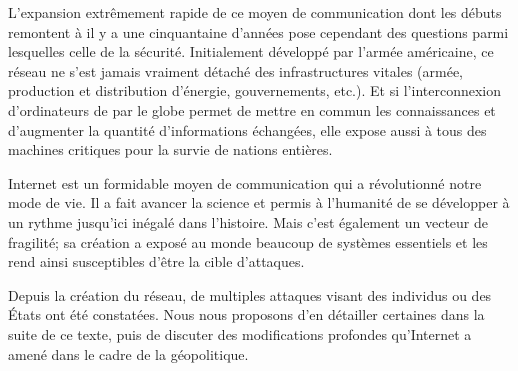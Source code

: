 \documentclass[article, french]{yReport}
\begin{document}
	L'expansion extrêmement rapide de ce moyen de communication dont les débuts remontent à il y a une cinquantaine d'années
	pose cependant des questions parmi lesquelles celle de la sécurité. Initialement développé par l'armée américaine, ce réseau ne s'est jamais vraiment détaché des infrastructures vitales (armée, production et distribution d'énergie, gouvernements, etc.). Et si l'interconnexion d'ordinateurs de par le globe permet de mettre en commun les connaissances et d'augmenter la quantité d'informations échangées, elle expose aussi à tous des machines critiques pour la survie de nations entières.
	
	Internet est un formidable moyen de communication qui a révolutionné notre mode de vie. Il a fait avancer la science et permis à l'humanité de se développer à un rythme jusqu'ici inégalé dans l'histoire. Mais c'est également un vecteur de fragilité; sa création a exposé au monde beaucoup de systèmes essentiels et les rend ainsi susceptibles d'être la cible d'attaques.
	
	Depuis la création du réseau, de multiples attaques visant des individus ou des États ont été constatées. Nous nous proposons d'en détailler certaines dans la suite de ce texte, puis de discuter des modifications profondes qu'Internet a amené dans le cadre de la géopolitique.
	
\end{document}
